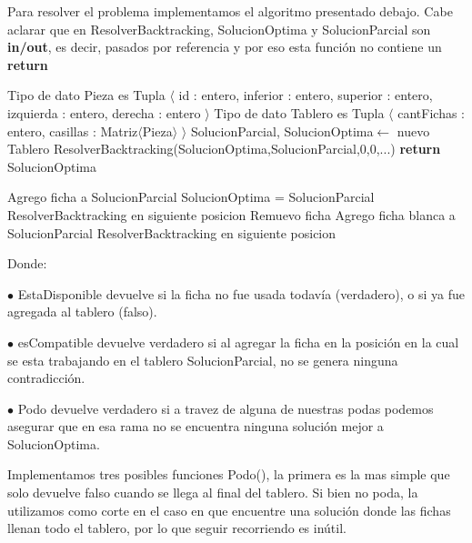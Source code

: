 Para resolver el problema implementamos el algoritmo presentado debajo. Cabe aclarar que en ResolverBacktracking, SolucionOptima y SolucionParcial son \textbf{in/out}, es decir, pasados por referencia y por eso esta función no contiene un \textbf{return}

\begin{pseudo}
\State Tipo de dato Pieza es Tupla $\langle$ id : entero, inferior : entero, superior : entero, izquierda : entero, derecha : entero $\rangle$
\State Tipo de dato Tablero es Tupla $\langle$ cantFichas : entero, casillas : Matriz$\langle$Pieza$\rangle$ $\rangle$
        \State SolucionParcial, SolucionOptima$\leftarrow$ nuevo Tablero
        \State ResolverBacktracking(SolucionOptima,SolucionParcial,0,0,...) 
        \State \textbf{return} SolucionOptima
    \EndProcedure
\end{pseudo}

\begin{pseudo}

	    \State Agrego ficha a SolucionParcial
	      \State SolucionOptima = SolucionParcial
	    \EndIf
	      \State ResolverBacktracking en siguiente posicion
	    \EndIf
	    \State Remuevo ficha 
	  \EndIf
	\EndFor
        \State Agrego ficha blanca a SolucionParcial
        \State ResolverBacktracking en siguiente posicion
    \EndProcedure
\end{pseudo}

Donde: 

$\bullet$ EstaDisponible devuelve si la ficha no fue usada todavía (verdadero), o si ya fue agregada al tablero (falso).

$\bullet$ esCompatible devuelve verdadero si al agregar la ficha en la posición en la cual se esta trabajando en el tablero SolucionParcial, no se genera ninguna contradicción.

$\bullet$ Podo devuelve verdadero si a travez de alguna de nuestras podas podemos asegurar que en esa rama no se encuentra ninguna solución mejor a SolucionOptima.

Implementamos tres posibles funciones Podo(), la primera es la mas simple que solo devuelve falso cuando se llega al final del tablero. Si bien no poda, la utilizamos como corte en el caso en que encuentre una solución donde las fichas llenan todo el tablero, por lo que seguir recorriendo es inútil.

